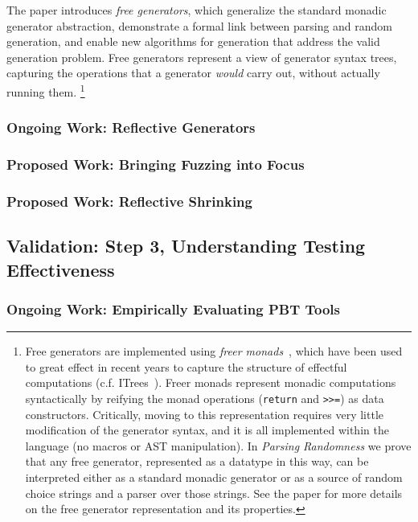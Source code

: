 The paper introduces {\em free generators}, which generalize the standard
monadic generator abstraction, demonstrate a formal link between parsing and
random generation, and enable new algorithms for generation that address the
valid generation problem. Free generators represent a view of generator syntax
trees, capturing the operations that a generator {\em would} carry out, without
actually running them.%
\footnote{Free generators are implemented using {\em freer
monads}~\cite{kiselyov2015freer}, which have been used to great effect in recent
years to capture the structure of effectful computations (c.f.
ITrees~\cite{old:xia2019interaction}). Freer monads represent monadic
computations syntactically by reifying the monad operations (\lstinline{return}
and \lstinline{>>=}) as data constructors. Critically, moving to this
representation requires very little modification of the generator syntax, and it
is all implemented within the language (no macros or AST manipulation). In {\em
Parsing Randomness} we prove that any free generator, represented as a datatype
in this way, can be interpreted either as a standard monadic generator or
as a source of random choice strings and a parser over those strings. See the
paper for more details on the free generator representation and its
properties.} 


\subsubsection{Ongoing Work: Reflective Generators}

\subsubsection{Proposed Work: Bringing Fuzzing into Focus}

\subsubsection{Proposed Work: Reflective Shrinking}

\subsection{Validation: Step 3, Understanding Testing Effectiveness }
\subsubsection{Ongoing Work: Empirically Evaluating PBT Tools}

